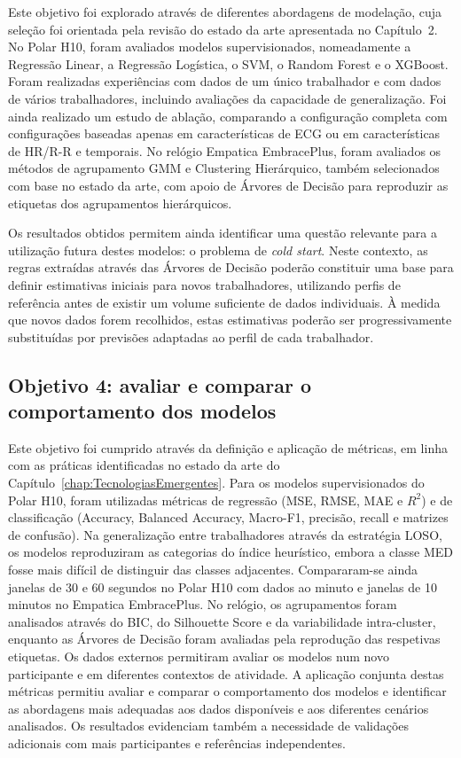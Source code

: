 Este objetivo foi explorado através de diferentes abordagens de modelação, cuja seleção foi orientada pela revisão do estado da arte apresentada no Capítulo~2. No Polar H10, foram avaliados modelos supervisionados, nomeadamente a Regressão Linear, a Regressão Logística, o SVM, o Random Forest e o XGBoost. Foram realizadas experiências com dados de um único trabalhador e com dados de vários trabalhadores, incluindo avaliações da capacidade de generalização. Foi ainda realizado um estudo de ablação, comparando a configuração completa com configurações baseadas apenas em características de ECG ou em características de HR/R-R e temporais. No relógio Empatica EmbracePlus, foram avaliados os métodos de agrupamento GMM e Clustering Hierárquico, também selecionados com base no estado da arte, com apoio de Árvores de Decisão para reproduzir as etiquetas dos agrupamentos hierárquicos.

Os resultados obtidos permitem ainda identificar uma questão relevante para a utilização futura destes modelos: o problema de \textit{cold start}. Neste contexto, as regras extraídas através das Árvores de Decisão poderão constituir uma base para definir estimativas iniciais para novos trabalhadores, utilizando perfis de referência antes de existir um volume suficiente de dados individuais. À medida que novos dados forem recolhidos, estas estimativas poderão ser progressivamente substituídas por previsões adaptadas ao perfil de cada trabalhador.

\subsection*{Objetivo 4: avaliar e comparar o comportamento dos modelos}

Este objetivo foi cumprido através da definição e aplicação de métricas, em linha com as práticas identificadas no estado da arte do Capítulo~\ref{chap:TecnologiasEmergentes}. Para os modelos supervisionados do Polar H10, foram utilizadas métricas de regressão (MSE, RMSE, MAE e $R^2$) e de classificação (Accuracy, Balanced Accuracy, Macro-F1, precisão, recall e matrizes de confusão). Na generalização entre trabalhadores através da estratégia LOSO, os modelos reproduziram as categorias do índice heurístico, embora a classe MED fosse mais difícil de distinguir das classes adjacentes. Compararam-se ainda janelas de 30 e 60 segundos no Polar H10 com dados ao minuto e janelas de 10 minutos no Empatica EmbracePlus. No relógio, os agrupamentos foram analisados através do BIC, do Silhouette Score e da variabilidade intra-cluster, enquanto as Árvores de Decisão foram avaliadas pela reprodução das respetivas etiquetas. Os dados externos permitiram avaliar os modelos num novo participante e em diferentes contextos de atividade. A aplicação conjunta destas métricas permitiu avaliar e comparar o comportamento dos modelos e identificar as abordagens mais adequadas aos dados disponíveis e aos diferentes cenários analisados. Os resultados evidenciam também a necessidade de validações adicionais com mais participantes e referências independentes.


